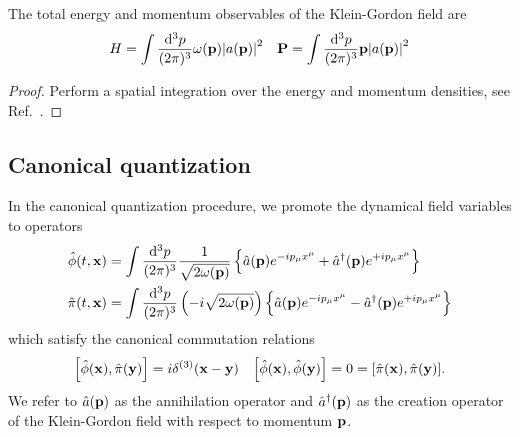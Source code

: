 \begin{lemma}
	The total energy and momentum observables of the Klein-Gordon field are
	\begin{align}
		H
		=
		\int\frac{\dd[3]{p}}{(2\pi)^3}
		\omega(\vb{p})\abs{a(\vb{p})}^2
		&&
		\vb{P}
		=
		\int\frac{\dd[3]{p}}{(2\pi)^3}
		\vb{p}\abs{a(\vb{p})}^2
		\label{eq:kg_energy_momentum}
	\end{align}
\end{lemma}
\begin{proof}
	Perform a spatial integration over the energy and momentum densities, see Ref.~\cite{Peskin1995}.
\end{proof}

\subsection{Canonical quantization}

\begin{definition}
	In the canonical quantization procedure, we promote the dynamical field variables to operators
	\begin{align}
		\hat\phi(t,\vb{x})
		&=
		\int\frac{\dd[3]{p}}{(2\pi)^3}
		\frac{1}{\sqrt{2\omega(\vb{p})}}
		\left\{
			\hat{a}(\vb{p})
			e^{-ip_\mu x^\mu}
			+
			\hat{a}^\dagger(\vb{p})
			e^{+ip_\mu x^\mu}
		\right\}
		\label{eq:qkg_pos}
		\\
		\hat\pi(t,\vb{x})
		&=
		\int\frac{\dd[3]{p}}{(2\pi)^3}
		\left(-i\sqrt{2\omega(\vb{p})}\right)
		\left\{
			\hat{a}(\vb{p})
			e^{-ip_\mu x^\mu}
			-
			\hat{a}^\dagger(\vb{p})
			e^{+ip_\mu x^\mu}
		\right\}
		\label{eq:qkg_mom}
	\end{align}
	which satisfy the canonical commutation relations
	\begin{align}
		\comm{\hat\phi(\vb{x})}{\hat\pi(\vb{y})}
		=
		i\delta^{(3)}(\vb{x}-\vb{y})
		&&
		\comm{\hat\phi(\vb{x})}{\hat\phi(\vb{y})}
		=
		0
		=
		\comm{\hat\pi(\vb{x})}{\hat\pi(\vb{y})}
		\label{eq:qkg_comm_pm}
		.
	\end{align}
	We refer to $\hat{a}(\vb{p})$ as the annihilation operator and $\hat{a}^\dagger(\vb{p})$ as the creation operator of the Klein-Gordon field with respect to momentum $\vb{p}$.
\end{definition}

